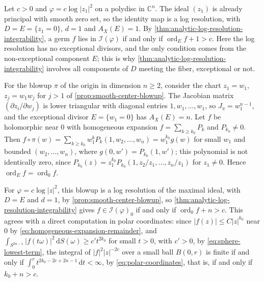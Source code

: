 \begin{example}\label{ex:strict-transform-integrability}
Let $c>0$ and $\varphi=c\log|z_1|^2$ on a polydisc in $\mathbb C^n$. The ideal $(z_1)$ is already principal with smooth zero set, so the identity map is a log resolution, with $D=E=\{z_1=0\}$, $d=1$ and $A_X(E)=1$. By \cref{thm:analytic-log-resolution-integrability}, a germ $f$ lies in $\mathcal I(\varphi)$ if and only if $\operatorname{ord}_Ef+1>c$. Here the log resolution has no exceptional divisors, and the only condition comes from the non-exceptional component $E$; this is why \cref{thm:analytic-log-resolution-integrability} involves all components of $D$ meeting the fiber, exceptional or not.

For the blowup $\pi$ of the origin in dimension $n\geq2$, consider the chart $z_1=w_1$, $z_j=w_1w_j$ for $j>1$ of \cref{prop:smooth-center-blowup}. The Jacobian matrix $(\partial z_i/\partial w_j)$ is lower triangular with diagonal entries $1,w_1,\ldots,w_1$, so $J_\pi=w_1^{n-1}$, and the exceptional divisor $E=\{w_1=0\}$ has $A_X(E)=n$. Let $f$ be holomorphic near $0$ with homogeneous expansion $f=\sum_{k\geq k_0}P_k$ and $P_{k_0}\neq0$. Then $f\circ\pi(w)=\sum_{k\geq k_0}w_1^kP_k(1,w_2,\ldots,w_n)=w_1^{k_0}g(w)$ for small $w_1$ and bounded $(w_2,\ldots,w_n)$, where $g(0,w')=P_{k_0}(1,w')$; this polynomial is not identically zero, since $P_{k_0}(z)=z_1^{k_0}P_{k_0}(1,z_2/z_1,\ldots,z_n/z_1)$ for $z_1\neq0$. Hence $\operatorname{ord}_Ef=\operatorname{ord}_0f$.

For $\varphi=c\log|z|^2$, this blowup is a log resolution of the maximal ideal, with $D=E$ and $d=1$, by \cref{prop:smooth-center-blowup}, so \cref{thm:analytic-log-resolution-integrability} gives $f\in\mathcal I(\varphi)_0$ if and only if $\operatorname{ord}_0f+n>c$. This agrees with a direct computation in polar coordinates: since $|f(z)|\leq C|z|^{k_0}$ near $0$ by \eqref{eq:homogeneous-expansion-remainder}, and $\int_{S^{2n-1}}|f(t\omega)|^2\,\mathrm dS(\omega)\geq c't^{2k_0}$ for small $t>0$, with $c'>0$, by \eqref{eq:sphere-lowest-term}, the integral of $|f|^2|z|^{-2c}$ over a small ball $B(0,r)$ is finite if and only if $\int_0^rt^{2k_0-2c+2n-1}\,\mathrm dt<\infty$, by \eqref{eq:polar-coordinates}, that is, if and only if $k_0+n>c$.
\end{example}
